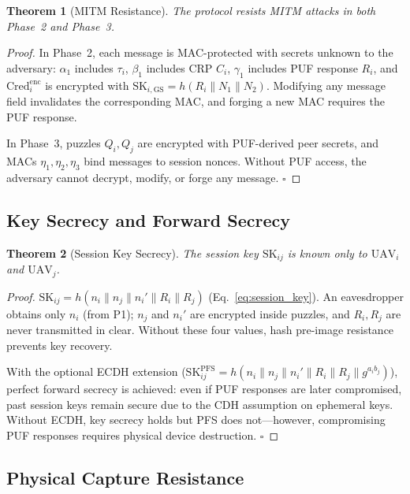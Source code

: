 \documentclass[11pt,a4paper]{article}
\newtheorem{theorem}{Theorem}
\begin{document}
\begin{theorem}[MITM Resistance]
\label{thm:mitm}
The protocol resists MITM attacks in both Phase~2 and Phase~3.
\end{theorem}

\begin{proof}
In Phase~2, each message is MAC-protected with secrets unknown to the adversary: $\alpha_1$ includes $\tau_i$, $\beta_1$ includes CRP $C_i$, $\gamma_1$ includes PUF response $R_i$, and $\text{Cred}_i^{\text{enc}}$ is encrypted with $\text{SK}_{i,\text{GS}} = h(R_i \| N_1 \| N_2)$. Modifying any message field invalidates the corresponding MAC, and forging a new MAC requires the PUF response.

In Phase~3, puzzles $Q_i, Q_j$ are encrypted with PUF-derived peer secrets, and MACs $\eta_1, \eta_2, \eta_3$ bind messages to session nonces. Without PUF access, the adversary cannot decrypt, modify, or forge any message. \hfill$\square$
\end{proof}

\subsection{Key Secrecy and Forward Secrecy}

\begin{theorem}[Session Key Secrecy]
\label{thm:key_secrecy}
The session key $\text{SK}_{ij}$ is known only to $\text{UAV}_i$ and $\text{UAV}_j$.
\end{theorem}

\begin{proof}
$\text{SK}_{ij} = h(n_i \| n_j \| n_i' \| R_i \| R_j)$ (Eq.~\ref{eq:session_key}). An eavesdropper obtains only $n_i$ (from P1); $n_j$ and $n_i'$ are encrypted inside puzzles, and $R_i, R_j$ are never transmitted in clear. Without these four values, hash pre-image resistance prevents key recovery.

With the optional ECDH extension ($\text{SK}_{ij}^{\text{PFS}} = h(n_i \| n_j \| n_i' \| R_i \| R_j \| g^{a_i b_j})$), perfect forward secrecy is achieved: even if PUF responses are later compromised, past session keys remain secure due to the CDH assumption on ephemeral keys. Without ECDH, key secrecy holds but PFS does not---however, compromising PUF responses requires physical device destruction. \hfill$\square$
\end{proof}

\subsection{Physical Capture Resistance}
\end{document}
